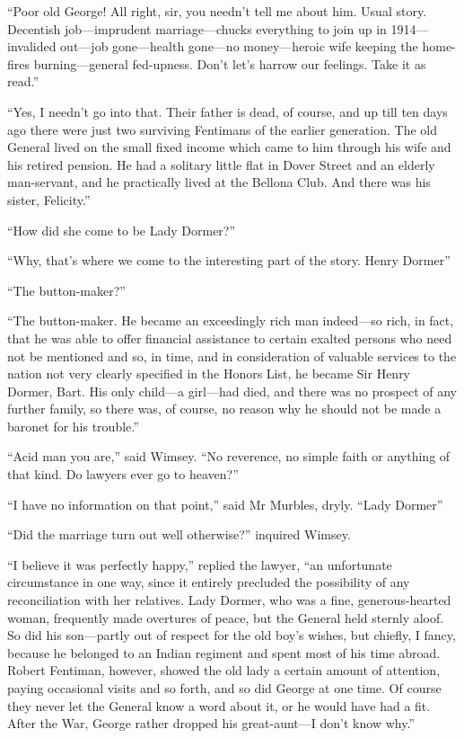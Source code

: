 \enquote{Poor old George! All right, sir, you needn't tell me about him. Usual story. Decentish job\allowbreak---\allowbreak imprudent marriage\allowbreak---\allowbreak chucks everything to join up in 1914\allowbreak---\allowbreak invalided out\allowbreak---\allowbreak job gone\allowbreak---\allowbreak health gone\allowbreak---\allowbreak no money\allowbreak---\allowbreak heroic wife keeping the home-fires burning\allowbreak---\allowbreak general fed-upness. Don't let's harrow our feelings. Take it as read.}

\enquote{Yes, I needn't go into that. Their father is dead, of course, and up till ten days ago there were just two surviving Fentimans of the earlier generation. The old General lived on the small fixed income which came to him through his wife and his retired pension. He had a solitary little flat in Dover Street and an elderly man-servant, and he practically lived at the Bellona Club. And there was his sister, Felicity.}

\enquote{How did she come to be Lady Dormer?}

\enquote{Why, that's where we come to the interesting part of the story. Henry Dormer\longdash}

\enquote{The button-maker?}

\enquote{The button-maker. He became an exceedingly rich man indeed\allowbreak---\allowbreak so rich, in fact, that he was able to offer financial assistance to certain exalted persons who need not be mentioned and so, in time, and in consideration of valuable services to the nation not very clearly specified in the Honors List, he became Sir Henry Dormer, Bart. His only child\allowbreak---\allowbreak a girl\allowbreak---\allowbreak had died, and there was no prospect of any further family, so there was, of course, no reason why he should not be made a baronet for his trouble.}

\enquote{Acid man you are,} said Wimsey. \enquote{No reverence, no simple faith or anything of that kind. Do lawyers ever go to heaven?}

\enquote{I have no information on that point,} said Mr Murbles, dryly. \enquote{Lady Dormer\longdash}

\enquote{Did the marriage turn out well otherwise?} inquired Wimsey.

\enquote{I believe it was perfectly happy,} replied the lawyer, \enquote{an unfortunate circumstance in one way, since it entirely precluded the possibility of any reconciliation with her relatives. Lady Dormer, who was a fine, generous-hearted woman, frequently made overtures of peace, but the General held sternly aloof. So did his son\allowbreak---\allowbreak partly out of respect for the old boy's wishes, but chiefly, I fancy, because he belonged to an Indian regiment and spent most of his time abroad. Robert Fentiman, however, showed the old lady a certain amount of attention, paying occasional visits and so forth, and so did George at one time. Of course they never let the General know a word about it, or he would have had a fit. After the War, George rather dropped his great-aunt\allowbreak---\allowbreak I don't know why.}

